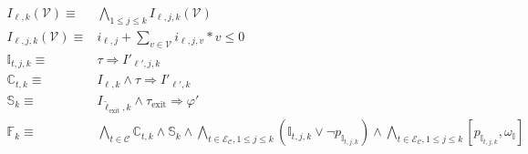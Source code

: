 \begin{figure}
  \centering
  \begingroup
  \addtolength{\jot}{2em}
  \begin{align}
    I_{\ell,k}(\mathcal{V}) \equiv & \bigwedge_{1 \leq j \leq k}{I_{\ell,j,k}(\mathcal{V})}\\
    I_{\ell,j,k}(\mathcal{V}) \equiv & i_{\ell,j} + \sum_{v \in \mathcal{V}}{i_{\ell,j,v} * v} \leq 0\\
    \mathbb{I}_{t,j,k} \equiv & \tau \Rightarrow I'_{\ell',j,k}\\
    \mathbb{C}_{t,k} \equiv & I_{\ell,k} \wedge \tau \Rightarrow I'_{\ell',k}\\
    \mathbb{S}_k \equiv & I_{\tilde{\ell}_\text{exit},k} \wedge \tau_\text{exit} \Rightarrow \varphi'\\
    \mathbb{F}_k \equiv & \bigwedge_{t \in \mathcal{C}} \mathbb{C}_{t, k} \wedge \mathbb{S}_k \wedge \bigwedge_{t \in \mathcal{E}_\mathcal{C}, 1 \leq j \leq k}{(\mathbb{I}_{t,j,k} \vee \neg p_{\mathbb{I}_{t,j,k}})} \wedge \bigwedge_{t \in \mathcal{E}_\mathcal{C}, 1 \leq j \leq k}{[p_{\mathbb{I}_{t,j,k}}, \omega_\mathbb{I}]}
  \end{align}
  \endgroup
\end{figure}
